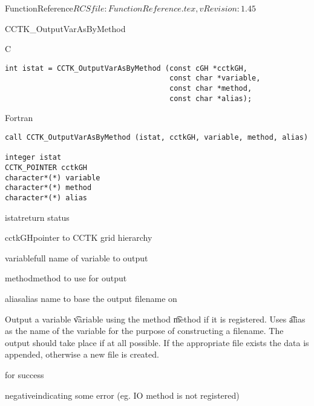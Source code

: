 \begin{cactuspart}{5}{FunctionReference}{$RCSfile: FunctionReference.tex,v $}{$Revision: 1.45 $}
\begin{FunctionDescription}{CCTK\_OutputVarAsByMethod}
\label{CCTK-OutputVarAsByMethod}
\begin{Synopsis}{C}
\begin{verbatim}
int istat = CCTK_OutputVarAsByMethod (const cGH *cctkGH,
                                      const char *variable,
                                      const char *method,
                                      const char *alias);
\end{verbatim}
\end{Synopsis}
\begin{Synopsis}{Fortran}
\begin{verbatim}
call CCTK_OutputVarAsByMethod (istat, cctkGH, variable, method, alias)

integer istat
CCTK_POINTER cctkGH
character*(*) variable
character*(*) method
character*(*) alias
\end{verbatim}
\end{Synopsis}
\begin{Parameter}{istat}return status\end{Parameter}
\begin{Parameter}{cctkGH}pointer to CCTK grid hierarchy\end{Parameter}
\begin{Parameter}{variable}full name of variable to output\end{Parameter}
\begin{Parameter}{method}method to use for output\end{Parameter}
\begin{Parameter}{alias}alias name to base the output filename on\end{Parameter}
\begin{Discussion}
Output a variable {\t variable} using the method {\t method} if it is
registered. Uses {\t alias} as the name of the variable for the purpose
of constructing a filename. The output should take place if at all possible.
If the appropriate file exists the data is appended, otherwise a new
file is created.
\end{Discussion}
\begin{Error}{0}for success\end{Error}
\begin{Error}{negative}indicating some error (eg. IO method is not registered)\end{Error}
\end{FunctionDescription}


\end{cactuspart}

